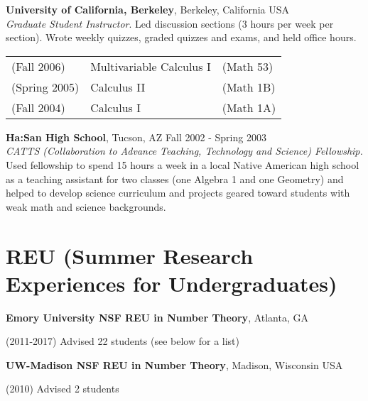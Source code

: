 \documentclass[margin,line]{res}
\newenvironment{list1}{
  \begin{list}{\ding{113}}{%
      \setlength{\itemsep}{0in}
      \setlength{\parsep}{0in} \setlength{\parskip}{0in}
      \setlength{\topsep}{0in} \setlength{\partopsep}{0in}
      \setlength{\leftmargin}{0.17in}}}{\end{list}}
\begin{document}
\begin{resume}
{\bf University of California, Berkeley}, Berkeley, California USA\\
\emph{Graduate Student Instructor}.  Led discussion sections (3 hours per week per section). Wrote weekly quizzes, graded quizzes and exams, and held office hours.
  \vspace*{-.1in}

  \begin{tabular}{lll}    
(Fall 2006)  & Multivariable Calculus I & (Math 53) \\
(Spring 2005) & Calculus II & (Math 1B)\\
(Fall 2004)  & Calculus I & (Math 1A) 
  \end{tabular}
  



{\bf Ha:San High School}, Tucson, AZ \hfill { Fall 2002 - Spring 2003}\\
{\em CATTS (Collaboration to Advance Teaching, Technology and Science)
  Fellowship.} Used fellowship to spend 15 hours a week in a local
Native American high school as a teaching assistant for two classes
(one Algebra 1 and one Geometry) and helped to develop science
curriculum and projects geared toward students with weak
math and science backgrounds.


\section{\sc REU (Summer Research Experiences for Undergraduates)}

  \begin{minipage}{\textwidth}
{\bf Emory University NSF REU in Number Theory}, Atlanta, GA
  \begin{list1}
  \item[]
    (2011-2017) Advised 22 students (see below for a list)
  \end{list1}
\end{minipage}

{\bf UW-Madison NSF REU in Number Theory}, Madison, Wisconsin USA
  \begin{list1}
  \item[]
    (2010) Advised 2 students 
  \end{list1}



\end{resume}
\end{document}
